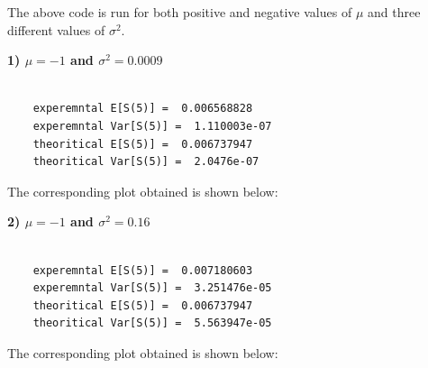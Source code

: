 \documentclass[12pt]{book}
\begin{document}
The above code is run for both positive and negative values of $\mu$ and three different values of $\sigma ^2$.


\textbf{1) $\mu=-1$ and $\sigma ^2=0.0009$}\\\\
\begin{lstlisting}
	experemntal E[S(5)] =  0.006568828 
	experemntal Var[S(5)] =  1.110003e-07 
	theoritical E[S(5)] =  0.006737947 
	theoritical Var[S(5)] =  2.0476e-07 
\end{lstlisting}
The corresponding plot obtained is shown below:
\begin{figure}[H]
	\centering
\end{figure}
\newpage
\textbf{2) $\mu=-1$ and $\sigma ^2=0.16$}\\\\
\begin{lstlisting}
	experemntal E[S(5)] =  0.007180603 
	experemntal Var[S(5)] =  3.251476e-05 
	theoritical E[S(5)] =  0.006737947 
	theoritical Var[S(5)] =  5.563947e-05 
\end{lstlisting}
The corresponding plot obtained is shown below:
\end{document}
